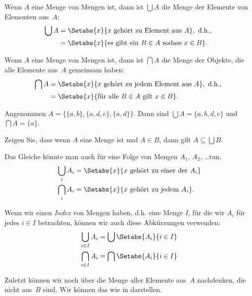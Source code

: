 \documentclass[../../../include/open-logic-section]{subfiles}
\begin{document}
\begin{defn}
Wenn $A$ eine Menge von Mengen ist, dann ist $\bigcup A$ die Menge der Elemente von
Elementen aus~$A$:
\begin{align*}
\bigcup A & = \Setabs{x}{x \text{ gehört zu Element aus } A},
\text{ d.h., }\\
& = \Setabs{x}{\text{es gibt ein } B \in A
  \text{ sodass } x \in B}.
\end{align*}
\end{defn}

\begin{defn}
Wenn $A$ eine Menge von Mengen ist, dann ist $\bigcap A$ die Menge der Objekte, die
alle Elemente aus~$A$ gemeinsam haben:
\begin{align*}
\bigcap A & = \Setabs{x}{x \text{ gehört zu jedem Element aus } A},
\text{ d.h., }\\
 & = \Setabs{x}{\text{für alle } B \in A \text{ gilt } x \in B}.
\end{align*}
\end{defn}

\begin{ex}
Angenommen $A = \{ \{ a, b \}, \{ a, d, e \}, \{ a, d \} \}$.
Dann sind $\bigcup A = \{ a, b, d, e \}$ und $\bigcap A = \{ a \}$.
\end{ex}
\begin{prob}
	Zeigen Sie, dass wenn $A$ eine Menge ist und $A \in B$, dann gilt $A \subseteq \bigcup B$.
\end{prob}

Das Gleiche könnte man auch für eine Folge von Mengen $A_1$, $A_2$, \dots tun.
\begin{align*}
\bigcup_i A_i & = \Setabs{x}{x \text{ gehört zu einer der } A_i}\\
\bigcap_i A_i & = \Setabs{x}{x \text{ gehört zu jedem } A_i}.
\end{align*}

Wenn wir einen \emph{Index} von Mengen haben, d.h. eine Menge $I$, für die wir
$A_i$ für jedes $i \in I$ betrachten, können wir auch diese
Abkürzungen verwenden:
\begin{align*}
	\bigcup_{i \in I} A_i & = \bigcup \Setabs{A_i }{i \in I}\\
	\bigcap_{i \in I} A_i & = \bigcap\Setabs{A_i}{i \in I}
\end{align*}

Zuletzt können wir noch über die Menge aller Elemente aus~$A$ nachdenken,
die nicht aus~$B$ sind. Wir können das wie in  darstellen.
\end{document}
